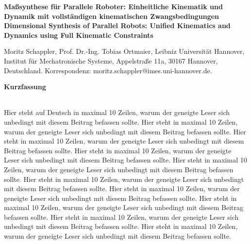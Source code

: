 \documentclass[fleqn,a4paper,10pt]{article}
\newenvironment{mytitle}{\fontsize{16pt}{1.0} \selectfont \bfseries}{\\}
\newenvironment*{myabstract}{\begin{Large}\bfseries}{\end{Large}\\[6pt]}%
\begin{document}
\begin{mytitle} 
Maßsynthese für Parallele Roboter: Einheitliche Kinematik und\\ Dynamik mit vollständigen kinematischen Zwangsbedingungen \\[6pt] %
Dimensional Synthesis of Parallel Robots: Unified Kinematics and\\ Dynamics using Full Kinematic Constraints
\end{mytitle}

Moritz Schappler, Prof. Dr.-Ing. Tobias Ortmaier, Leibniz Universität Hannover, Institut für Mechatronische Systeme, Appelstraße 11a, 30167 Hannover, Deutschland. Korrespondenz: moritz.schappler@imes.uni-hannover.de.

\vspace{24pt} %

\begin{myabstract} Kurzfassung \end{myabstract}
Hier steht auf Deutsch in maximal 10 Zeilen, warum der geneigte Leser sich unbedingt mit diesem Beitrag befassen sollte. Hier steht in maximal 10 Zeilen, warum der geneigte Leser sich unbedingt mit diesem Beitrag befassen sollte. Hier steht in maximal 10 Zeilen, warum der geneigte Leser sich unbedingt mit diesem Beitrag befassen sollte. Hier steht in maximal 10 Zeilen, warum der geneigte Leser sich unbedingt mit diesem Beitrag befassen sollte. Hier steht in maximal 10 Zeilen, warum der geneigte Leser sich unbedingt mit diesem Beitrag befassen sollte. Hier steht in maximal 10 Zeilen, warum der geneigte Leser sich unbedingt mit diesem Beitrag befassen sollte. Hier steht in maximal 10 Zeilen, warum der geneigte Leser sich unbedingt mit diesem Beitrag befassen sollte. Hier steht in maximal 10 Zeilen, warum der geneigte Leser sich unbedingt mit diesem Beitrag befassen sollte. Hier steht in maximal 10 Zeilen, warum der geneigte Leser sich unbedingt mit diesem Beitrag befassen sollte. Hier steht in maximal 10 Zeilen, warum der geneigte Leser sich unbedingt mit diesem Beitrag befassen sollte.


\vspace{12pt} %
\end{document}
